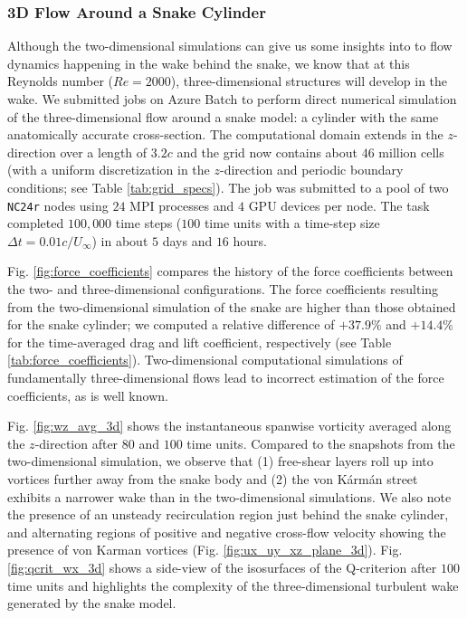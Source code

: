 \documentclass[10pt,journal,compsoc]{IEEEtran}
\begin{document}
\subsubsection{3D Flow Around a Snake Cylinder}

Although the two-dimensional simulations can give us some insights into to flow dynamics happening in the wake behind the snake, we know that at this Reynolds number ($Re = 2000$), three-dimensional structures will develop in the wake.
We submitted jobs on Azure Batch to perform direct numerical simulation of the three-dimensional flow around a snake model: a cylinder with the same anatomically accurate cross-section.
The computational domain extends in the $z$-direction over a length of $3.2c$ and the grid now contains about $46$ million cells (with a uniform discretization in the $z$-direction and periodic boundary conditions; see Table \ref{tab:grid_specs}).
The job was submitted to a pool of two \texttt{NC24r} nodes using $24$ MPI processes and $4$ GPU devices per node.
The task completed $100,000$ time steps ($100$ time units with a time-step size $\Delta t = 0.01 c / U_\infty$) in about $5$ days and $16$ hours.

Fig. \ref{fig:force_coefficients} compares the history of the force coefficients between the two- and three-dimensional configurations.
The force coefficients resulting from the two-dimensional simulation of the snake are higher than those obtained for the snake cylinder; we computed a relative difference of $+37.9\%$ and $+14.4\%$ for the time-averaged drag and lift coefficient, respectively (see Table \ref{tab:force_coefficients}).
Two-dimensional computational simulations of fundamentally three-dimensional flows lead to incorrect estimation of the force coefficients, as is well known\cite{mittal_balachandar_1995}.

Fig. \ref{fig:wz_avg_3d} shows the instantaneous spanwise vorticity averaged along the $z$-direction after $80$ and $100$ time units.
Compared to the snapshots from the two-dimensional simulation, we observe that (1) free-shear layers roll up into vortices further away from the snake body and (2) the von K\'{a}rm\'{a}n street exhibits a narrower wake than in the two-dimensional simulations.
We also note the presence of an unsteady recirculation region just behind the snake cylinder, and alternating regions of positive and negative cross-flow velocity showing the presence of von Karman vortices (Fig. \ref{fig:ux_uy_xz_plane_3d}).
Fig. \ref{fig:qcrit_wx_3d} shows a side-view of the isosurfaces of the Q-criterion after $100$ time units and highlights the complexity of the three-dimensional turbulent wake generated by the snake model.
\end{document}
